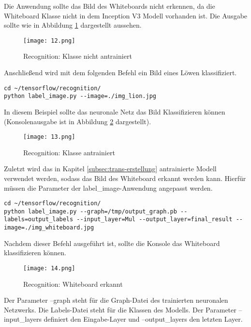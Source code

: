 Die Anwendung sollte das Bild des Whiteboards nicht erkennen, da die Whiteboard Klasse nicht in dem Inception V3 Modell vorhanden ist. Die Ausgabe sollte wie in Abbildung \ref{fig:12} dargestellt aussehen.

\begin{figure}[!h]
	\texttt{[image: 12.png]}
	\caption{Recognition: Klasse nicht antrainiert}
	\label{fig:12}
\end{figure}

Anschließend wird mit dem folgenden Befehl ein Bild eines Löwen klassifiziert.

\begin{lstlisting}[frame=single]
cd ~/tensorflow/recognition/
python label_image.py --image=./img_lion.jpg
\end{lstlisting}

In diesem Beispiel sollte das neuronale Netz das Bild Klassifizieren können (Konsolenausgabe ist in Abbildung \ref{fig:13} dargestellt).

\begin{figure}[!h]
	\texttt{[image: 13.png]}
	\caption{Recognition: Klasse antrainiert}
	\label{fig:13}
\end{figure}

Zuletzt wird das in Kapitel \ref{subsec:trans-erstellung} antrainierte Modell verwendet werden, sodass das Bild des Whiteboard erkannt werden kann. Hierfür müssen die Parameter der \glqq{}label\_image\grqq{}-Anwendung angepasst werden.

\begin{lstlisting}[frame=single]
cd ~/tensorflow/recognition/
python label_image.py --graph=/tmp/output_graph.pb --labels=output_labels --input_layer=Mul --output_layer=final_result --image=./img_whiteboard.jpg
\end{lstlisting}

Nachdem dieser Befehl ausgeführt ist, sollte die Konsole das Whiteboard klassifizieren können.

\begin{figure}[!h]
	\texttt{[image: 14.png]}
	\caption{Recognition: Whiteboard erkannt}
	\label{fig:14}
\end{figure}

Der Parameter \glqq{}--graph\grqq{} steht für die Graph-Datei des trainierten neuronalen Netzwerks. Die Labels-Datei steht für die Klassen des Modells. Der Parameter \glqq{}--input\_layers\grqq{} definiert den Eingabe-Layer und \glqq{}--output\_layers\grqq{} den letzten Layer.
